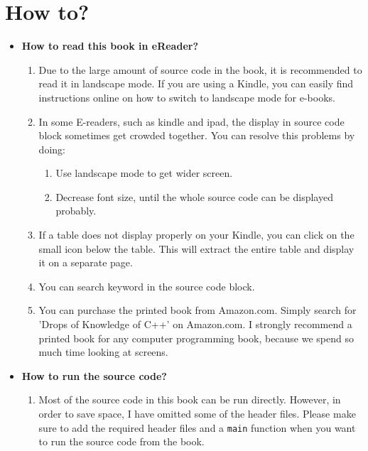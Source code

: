 \documentclass[a4paper,11pt,twoside]{book}
\begin{document}
\chapter*{How to?}
\begin{itemize}
	\item \textbf{How to read this book in eReader?}
	\begin{enumerate}
		\item Due to the large amount of source code in the book, it is recommended to read it in landscape mode. If you are using a Kindle, you can easily find instructions online on how to switch to landscape mode for e-books. 
		
		\item In some E-readers, such as kindle and ipad, the display in source code block sometimes get crowded together. You can resolve this problems by doing:
		\begin{enumerate}
			\item Use landscape mode to get wider screen.
			\item Decrease font size, until the whole source code can be displayed probably.
		\end{enumerate}
		
		\item If a table does not display properly on your Kindle, you can click on the small icon below the table. This will extract the entire table and display it on a separate page. 
		
		\item You can search keyword in the source code block.
		
		\item You can purchase the printed book from Amazon.com. Simply search for 'Drops of Knowledge of C++' on Amazon.com. I strongly recommend a printed book for any computer programming book, because we spend so much time looking at screens.
		
	\end{enumerate}

	\item \textbf{How to run the source code?}
	\begin{enumerate}
		\item Most of the source code in this book can be run directly. However, in order to save space, I have omitted some of the header files. Please make sure to add the required header files and a \texttt{main} function when you want to run the source code from the book.
		

\end{enumerate}
\end{itemize}
\end{document}
